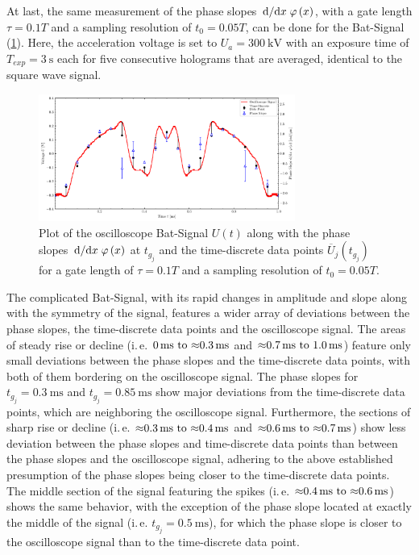 At last, the same measurement of the phase slopes $\dv*{}{x} \varphi\left(x\right)$, with a gate length $\tau = 0.1T$ and a sampling resolution of $t_0 = 0.05T$, can be done for the Bat-Signal (\cref{fig:batman-slope}). Here, the acceleration voltage is set to $U_a = \SI{300}{\kilo\volt}$ with an exposure time of $T_{exp} = \SI{3}{\second}$ each for five consecutive holograms that are averaged, identical to the square wave signal.
\begin{figure}[H]
	\centering
	\includegraphics[width=0.75\textwidth]{Figures/Slope/batman_slope.pdf}
	\caption{Plot of the oscilloscope Bat-Signal $U\left(t\right)$ along with the phase slopes $\dv*{}{x} \varphi\left(x\right)$ at $t_{g_j}$ and the time-discrete data points $\overline{U}_j\left(t_{g_j}\right)$ for a gate length of $\tau = 0.1T$ and a sampling resolution of $t_0 = 0.05T$.}
	\label{fig:batman-slope}
\end{figure}
The complicated Bat-Signal, with its rapid changes in amplitude and slope along with the symmetry of the signal, features a wider array of deviations between the phase slopes, the time-discrete data points and the oscilloscope signal. The areas of steady rise or decline (i.\,e. $\SIrange{0}{\approx 0.3}{\milli\second}$ and $\SIrange{\approx 0.7}{1.0}{\milli\second}$) feature only small deviations between the phase slopes and the time-discrete data points, with both of them bordering on the oscilloscope signal. The phase slopes for $t_{g_j} = \SI{0.3}{\milli\second}$ and $t_{g_j} = \SI{0.85}{\milli\second}$ show major deviations from the time-discrete data points, which are neighboring the oscilloscope signal. Furthermore, the sections of sharp rise or decline (i.\,e. $\SIrange{\approx 0.3}{\approx 0.4}{\milli\second}$ and $\SIrange{\approx 0.6}{\approx 0.7}{\milli\second}$) show less deviation between the phase slopes and time-discrete data points than between the phase slopes and the oscilloscope signal, adhering to the above established presumption of the phase slopes being closer to the time-discrete data points. The middle section of the signal featuring the spikes (i.\,e. $\SIrange{\approx 0.4}{\approx 0.6}{\milli\second}$) shows the same behavior, with the exception of the phase slope located at exactly the middle of the signal (i.\,e. $t_{g_j} = \SI{0.5}{\milli\second}$), for which the phase slope is closer to the oscilloscope signal than to the time-discrete data point.
